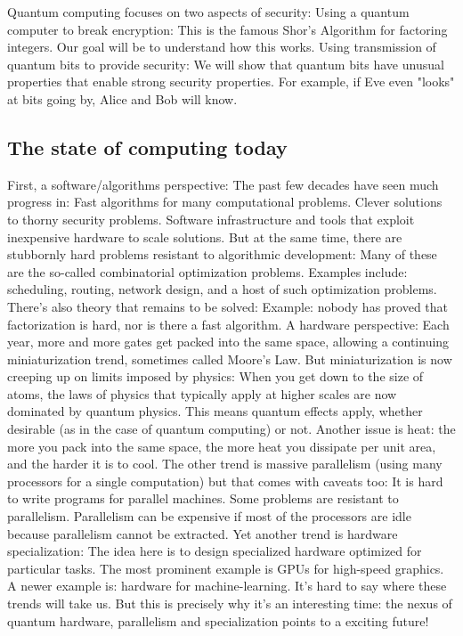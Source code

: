 \documentclass[main.tex]{subfiles}
\begin{document}
Quantum computing focuses on two aspects of security: Using a quantum computer to break encryption: This is the famous Shor's Algorithm for factoring integers. Our goal will be to understand how this works. Using transmission of quantum bits to provide security: We will show that quantum bits have unusual properties that enable strong security properties. For example, if Eve even "looks" at bits going by, Alice and Bob will know.

\subsection{The state of computing today}

First, a software/algorithms perspective: The past few decades have seen much progress in: Fast algorithms for many computational problems. Clever solutions to thorny security problems. Software infrastructure and tools that exploit inexpensive hardware to scale solutions. But at the same time, there are stubbornly hard problems resistant to algorithmic development: Many of these are the so-called combinatorial optimization problems. Examples include: scheduling, routing, network design, and a host of such optimization problems. There's also theory that remains to be solved: Example: nobody has proved that factorization is hard, nor is there a fast algorithm. A hardware perspective: Each year, more and more gates get packed into the same space, allowing a continuing miniaturization trend, sometimes called Moore's Law. But miniaturization is now creeping up on limits imposed by physics: When you get down to the size of atoms, the laws of physics that typically apply at higher scales are now dominated by quantum physics. This means quantum effects apply, whether desirable (as in the case of quantum computing) or not. Another issue is heat: the more you pack into the same space, the more heat you dissipate per unit area, and the harder it is to cool. The other trend is massive parallelism (using many processors for a single computation) but that comes with caveats too: It is hard to write programs for parallel machines. Some problems are resistant to parallelism. Parallelism can be expensive if most of the processors are idle because parallelism cannot be extracted. Yet another trend is hardware specialization: The idea here is to design specialized hardware optimized for particular tasks. The most prominent example is GPUs for high-speed graphics. A newer example is: hardware for machine-learning. It's hard to say where these trends will take us. But this is precisely why it's an interesting time: the nexus of quantum hardware, parallelism and specialization points to a exciting future!
\end{document}
